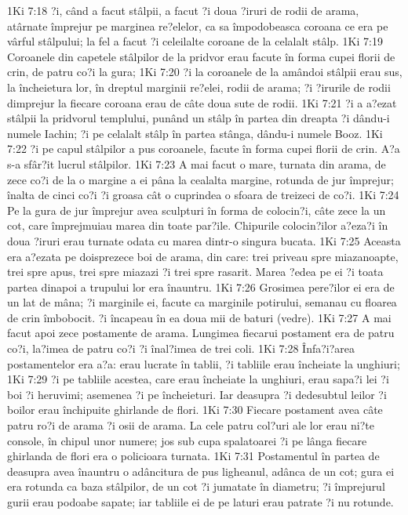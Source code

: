 1Ki 7:18  ?i, când a facut stâlpii, a facut ?i doua ?iruri de rodii de arama, atârnate împrejur pe marginea re?elelor, ca sa împodobeasca coroana ce era pe vârful stâlpului; la fel a facut ?i celeilalte coroane de la celalalt stâlp.
1Ki 7:19  Coroanele din capetele stâlpilor de la pridvor erau facute în forma cupei florii de crin, de patru co?i la gura;
1Ki 7:20  ?i la coroanele de la amândoi stâlpii erau sus, la încheietura lor, în dreptul marginii re?elei, rodii de arama; ?i ?irurile de rodii dimprejur la fiecare coroana erau de câte doua sute de rodii.
1Ki 7:21  ?i a a?ezat stâlpii la pridvorul templului, punând un stâlp în partea din dreapta ?i dându-i numele Iachin; ?i pe celalalt stâlp în partea stânga, dându-i numele Booz.
1Ki 7:22  ?i pe capul stâlpilor a pus coroanele, facute în forma cupei florii de crin. A?a s-a sfâr?it lucrul stâlpilor.
1Ki 7:23  A mai facut o mare, turnata din arama, de zece co?i de la o margine a ei pâna la cealalta margine, rotunda de jur împrejur; înalta de cinci co?i ?i groasa cât o cuprindea o sfoara de treizeci de co?i.
1Ki 7:24  Pe la gura de jur împrejur avea sculpturi în forma de colocin?i, câte zece la un cot, care împrejmuiau marea din toate par?ile. Chipurile colocin?ilor a?eza?i în doua ?iruri erau turnate odata cu marea dintr-o singura bucata.
1Ki 7:25  Aceasta era a?ezata pe doisprezece boi de arama, din care: trei priveau spre miazanoapte, trei spre apus, trei spre miazazi ?i trei spre rasarit. Marea ?edea pe ei ?i toata partea dinapoi a trupului lor era înauntru.
1Ki 7:26  Grosimea pere?ilor ei era de un lat de mâna; ?i marginile ei, facute ca marginile potirului, semanau cu floarea de crin îmbobocit. ?i încapeau în ea doua mii de baturi (vedre).
1Ki 7:27  A mai facut apoi zece postamente de arama. Lungimea fiecarui postament era de patru co?i, la?imea de patru co?i ?i înal?imea de trei coli.
1Ki 7:28  Înfa?i?area postamentelor era a?a: erau lucrate în tablii, ?i tabliile erau încheiate la unghiuri;
1Ki 7:29  ?i pe tabliile acestea, care erau încheiate la unghiuri, erau sapa?i lei ?i boi ?i heruvimi; asemenea ?i pe încheieturi. Iar deasupra ?i dedesubtul leilor ?i boilor erau închipuite ghirlande de flori.
1Ki 7:30  Fiecare postament avea câte patru ro?i de arama ?i osii de arama. La cele patru col?uri ale lor erau ni?te console, în chipul unor numere; jos sub cupa spalatoarei ?i pe lânga fiecare ghirlanda de flori era o policioara turnata.
1Ki 7:31  Postamentul în partea de deasupra avea înauntru o adâncitura de pus ligheanul, adânca de un cot; gura ei era rotunda ca baza stâlpilor, de un cot ?i jumatate în diametru; ?i împrejurul gurii erau podoabe sapate; iar tabliile ei de pe laturi erau patrate ?i nu rotunde.
